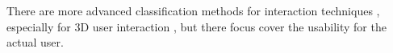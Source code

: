 \documentclass[review,journal]{vgtc}         %
\begin{document}
\begin{figure}
    \centering
    \hfill
\end{figure}


There are more advanced classification methods for interaction techniques \cite{stars:65-93:2012}, especially for 3D user interaction \cite{CGF:CGF194, Kettner95aclassification, 978-3-319-07458-0_1}, but there focus cover the usability for the actual user.
\end{document}

